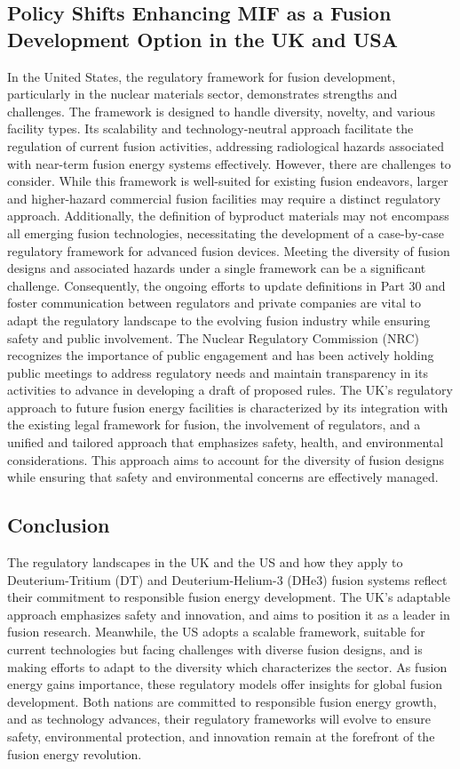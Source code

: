 \subsection{Policy Shifts Enhancing MIF as a Fusion Development Option in the UK and USA}
In the United States, the regulatory framework for fusion development, particularly in the nuclear materials sector, demonstrates strengths and challenges. The framework is designed to handle diversity, novelty, and various facility types. \cite{nrc} Its scalability and technology-neutral approach facilitate the regulation of current fusion activities, addressing radiological hazards associated with near-term fusion energy systems effectively. However, there are challenges to consider. While this framework is well-suited for existing fusion endeavors, larger and higher-hazard commercial fusion facilities may require a distinct regulatory approach. Additionally, the definition of byproduct materials may not encompass all emerging fusion technologies, necessitating the development of a case-by-case regulatory framework for advanced fusion devices. \cite{nrc} Meeting the diversity of fusion designs and associated hazards under a single framework can be a significant challenge. Consequently, the ongoing efforts to update definitions in Part 30 and foster communication between regulators and private companies are vital to adapt the regulatory landscape to the evolving fusion industry while ensuring safety and public involvement. The Nuclear Regulatory Commission (NRC) recognizes the importance of public engagement and has been actively holding public meetings to address regulatory needs and maintain transparency in its activities to advance in developing a draft of proposed rules. \cite{nrcFusionSystems}
The UK's regulatory approach to future fusion energy facilities is characterized by its integration with the existing legal framework for fusion, the involvement of regulators, and a unified and tailored approach that emphasizes safety, health, and environmental considerations. \cite{Business_2022} This approach aims to account for the diversity of fusion designs while ensuring that safety and environmental concerns are effectively managed.

\subsection{Conclusion}
The regulatory landscapes in the UK and the US and how they apply to Deuterium-Tritium (DT) and Deuterium-Helium-3 (DHe3) fusion systems reflect their commitment to responsible fusion energy development. The UK's adaptable approach emphasizes safety and innovation, and aims to position it as a leader in fusion research. Meanwhile, the US adopts a scalable framework, suitable for current technologies but facing challenges with diverse fusion designs, and is making efforts to adapt to the diversity which characterizes the sector.
As fusion energy gains importance, these regulatory models offer insights for global fusion development. Both nations are committed to responsible fusion energy growth, and as technology advances, their regulatory frameworks will evolve to ensure safety, environmental protection, and innovation remain at the forefront of the fusion energy revolution.

